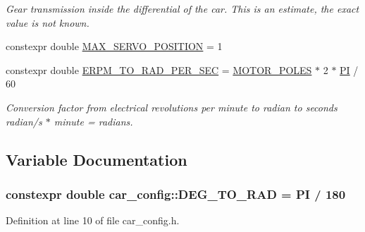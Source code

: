 \begin{DoxyCompactItemize}
\begin{DoxyCompactList}\small\item\em Gear transmission inside the differential of the car. This is an estimate, the exact value is not known. \end{DoxyCompactList}\item 
constexpr double \hyperlink{namespacecar__config_af1712762f3ad9f8805ba474d5f3e7274}{M\+A\+X\+\_\+\+S\+E\+R\+V\+O\+\_\+\+P\+O\+S\+I\+T\+I\+ON} = 1
\item 
constexpr double \hyperlink{namespacecar__config_a877c4a772a47f4737d9f03fe8a22e106}{E\+R\+P\+M\+\_\+\+T\+O\+\_\+\+R\+A\+D\+\_\+\+P\+E\+R\+\_\+\+S\+EC} = \hyperlink{namespacecar__config_a611a0f02cf52db1d438a2dd53b642cd5}{M\+O\+T\+O\+R\+\_\+\+P\+O\+L\+ES} $\ast$ 2 $\ast$ \hyperlink{namespacecar__config_a90cb9957197db8924811c447bc98703a}{PI} / 60
\begin{DoxyCompactList}\small\item\em Conversion factor from electrical revolutions per minute to radian to seconds  radian/s $\ast$ minute = radians. \end{DoxyCompactList}\end{DoxyCompactItemize}


\subsection{Variable Documentation}
\subsubsection[{\texorpdfstring{D\+E\+G\+\_\+\+T\+O\+\_\+\+R\+AD}{DEG_TO_RAD}}]{\setlength{\rightskip}{0pt plus 5cm}constexpr double car\+\_\+config\+::\+D\+E\+G\+\_\+\+T\+O\+\_\+\+R\+AD = {\bf PI} / 180}\hypertarget{namespacecar__config_a72deaa1a555d694e52fb768ffba1d8cb}{}\label{namespacecar__config_a72deaa1a555d694e52fb768ffba1d8cb}


Definition at line 10 of file car\+\_\+config.\+h.


